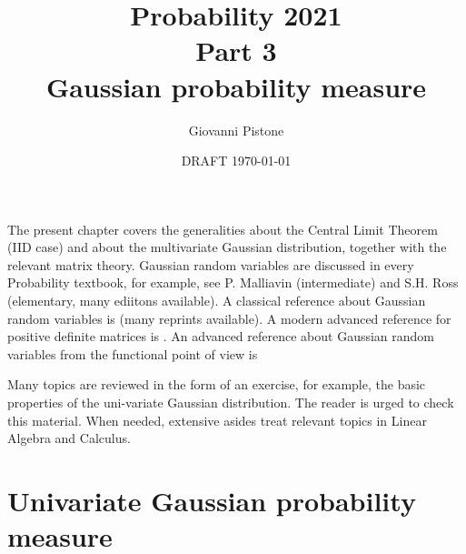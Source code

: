 \documentclass[12pt,a4paper]{amsart}
\title{Probability 2021 \\ Part 3 \\
Gaussian probability measure}
\author[G. Pistone]{Giovanni Pistone}
\date{DRAFT \today}
\theoremstyle{plain}%
\theoremstyle{definition}
\theoremstyle{remark}
\begin{document}
\maketitle
\tableofcontents

The present chapter covers the generalities about the Central Limit Theorem (IID
case) and  about the multivariate Gaussian distribution, together with the relevant matrix theory. Gaussian random
variables are discussed in every Probability textbook, for example, see P. Malliavin
\cite[Ch.~V]{malliavin:1995} (intermediate) and  S.H. Ross \cite[Ch.~10]{ross:2010introduction10} (elementary, many ediitons available). A classical reference about Gaussian random
variables is \cite{anderson:2003-3ed} (many reprints available). A
modern advanced reference for positive definite matrices is
\cite{bhatia:2007}. An advanced reference about Gaussian random variables from the functional point of view is \cite{janson:1997-GHS}

Many topics are reviewed in the form of an exercise, for example, the basic properties of the
uni-variate Gaussian distribution. The reader is urged to check this material. When needed, extensive asides treat relevant topics in Linear Algebra and Calculus.

\section{Univariate Gaussian probability measure}
\label{sec:introduction}
\end{document}

